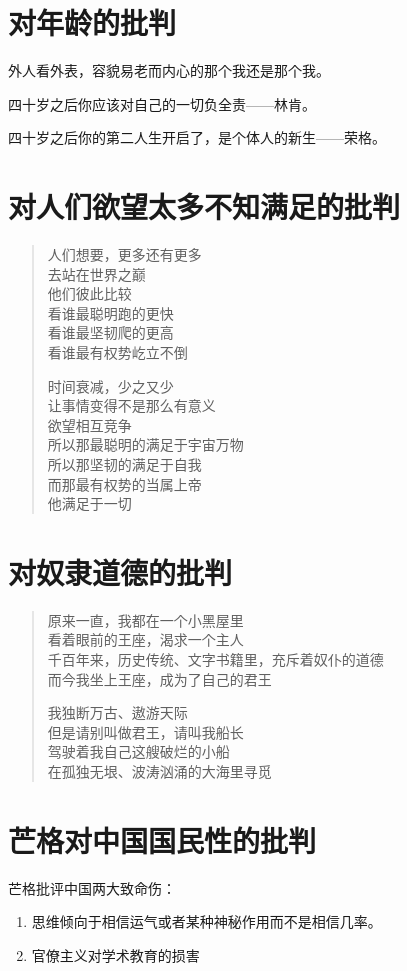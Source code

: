 \documentclass[12pt,oneside]{book}
\newenvironment{shici}{
\begin{verse}
\centering\large\hspace{12pt}}
{\end{verse}}
\begin{document}
\chapter{对年龄的批判}
外人看外表，容貌易老而内心的那个我还是那个我。

四十岁之后你应该对自己的一切负全责——林肯。

四十岁之后你的第二人生开启了，是个体人的新生——荣格。


\chapter{对人们欲望太多不知满足的批判}
\begin{shici}
人们想要，更多还有更多\\
去站在世界之巅\\
他们彼此比较\\
看谁最聪明跑的更快\\
看谁最坚韧爬的更高\\
看谁最有权势屹立不倒

时间衰减，少之又少\\
让事情变得不是那么有意义\\
欲望相互竞争\\
所以那最聪明的满足于宇宙万物\\
所以那坚韧的满足于自我\\
而那最有权势的当属上帝\\
他满足于一切
\end{shici}



\chapter{对奴隶道德的批判}
\begin{shici}
原来一直，我都在一个小黑屋里\\
看着眼前的王座，渴求一个主人\\
千百年来，历史传统、文字书籍里，充斥着奴仆的道德\\
而今我坐上王座，成为了自己的君王 

我独断万古、遨游天际\\
但是请别叫做君王，请叫我船长\\
驾驶着我自己这艘破烂的小船\\
在孤独无垠、波涛汹涌的大海里寻觅 
\end{shici}

\chapter{芒格对中国国民性的批判}
芒格批评中国两大致命伤：

\begin{enumerate}
\item 思维倾向于相信运气或者某种神秘作用而不是相信几率。
\item 官僚主义对学术教育的损害
\end{enumerate}
\end{document}
